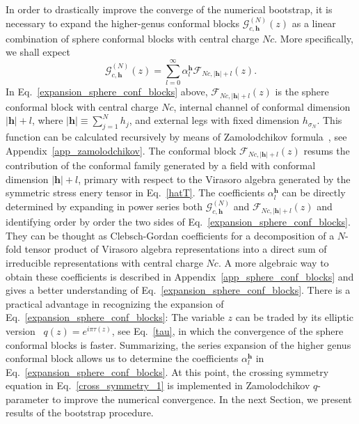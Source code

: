 \documentclass[a4paper,11pt]{article}
\begin{document}
In order to drastically improve the converge of the numerical bootstrap, it is necessary to expand the higher-genus conformal blocks $\mathcal{G}_{c,\boldsymbol{h}}^{(N)}(z)$ as a linear combination of sphere conformal blocks with central charge $Nc$. More specifically, we shall expect
\begin{equation}\label{expansion_sphere_conf_blocks}
 \mathcal{G}_{c, \boldsymbol{h}}^{(N)}(z)=\sum_{l=0}^{\infty}\alpha_{l}^{\boldsymbol{h}}
 \mathcal{F}_{Nc, |\boldsymbol{h}|+l}(z).
\end{equation}
In Eq.~\eqref{expansion_sphere_conf_blocks} above,  $\mathcal{F}_{Nc, |\boldsymbol{h}|+l}(z)$ is the sphere conformal block 
with central charge $Nc$, internal channel of conformal dimension $|\boldsymbol{h}|+l$, where $|\boldsymbol{h}|\equiv \sum_{j=1}^N h_j$, and external legs with fixed dimension 
$h_{\sigma_N}$. This function can be calculated
recursively by means of Zamolodchikov formula~\cite{Zamolodchikov2, Zamolodchikov}, see Appendix~\ref{app_zamolodchikov}. The conformal block   $\mathcal{F}_{Nc, |\boldsymbol{h}|+l}(z)$ resums the contribution of the conformal family generated by a field with conformal dimension $|\boldsymbol{h}|+l$, primary with respect to the Virasoro algebra generated by the symmetric stress enery tensor in Eq.~\eqref{hatT}. The coefficients $\alpha_l^{\boldsymbol{h}}$
can be directly determined by expanding in power series both $\mathcal{G}_{c, \boldsymbol{h}}^{(N)}$ 
and $\mathcal{F}_{Nc, |\boldsymbol{h}|+l}(z)$ and identifying order by order the two 
sides of Eq.~\eqref{expansion_sphere_conf_blocks}. 
They can be thought as Clebsch-Gordan coefficients for a decomposition of a $N$-fold  tensor product of Virasoro algebra representations into a direct sum of irreducible representations with central charge $Nc$. A more algebraic way to obtain 
these coefficients is described in Appendix~\ref{app_sphere_conf_blocks} and 
gives a better understanding of Eq.~\eqref{expansion_sphere_conf_blocks}. There is a practical 
advantage in recognizing the expansion of Eq.~\eqref{expansion_sphere_conf_blocks}: The variable $z$ 
can be traded by its elliptic version~\cite{Zamolodchikov} $q(z)=e^{i\pi \tau(z)}$, see Eq.~\eqref{tau}, in which the convergence of the 
sphere conformal blocks is faster. Summarizing, the series expansion of the higher genus conformal block allows us to determine the coefficients $\alpha_{l}^{\boldsymbol{h}}$ in Eq.~\eqref{expansion_sphere_conf_blocks}. At this point,  the crossing symmetry equation in Eq.~\eqref{cross_symmetry_1} is implemented in Zamolodchikov $q$-parameter to improve the numerical convergence. In the next Section, we present results of the bootstrap procedure.
\end{document}
